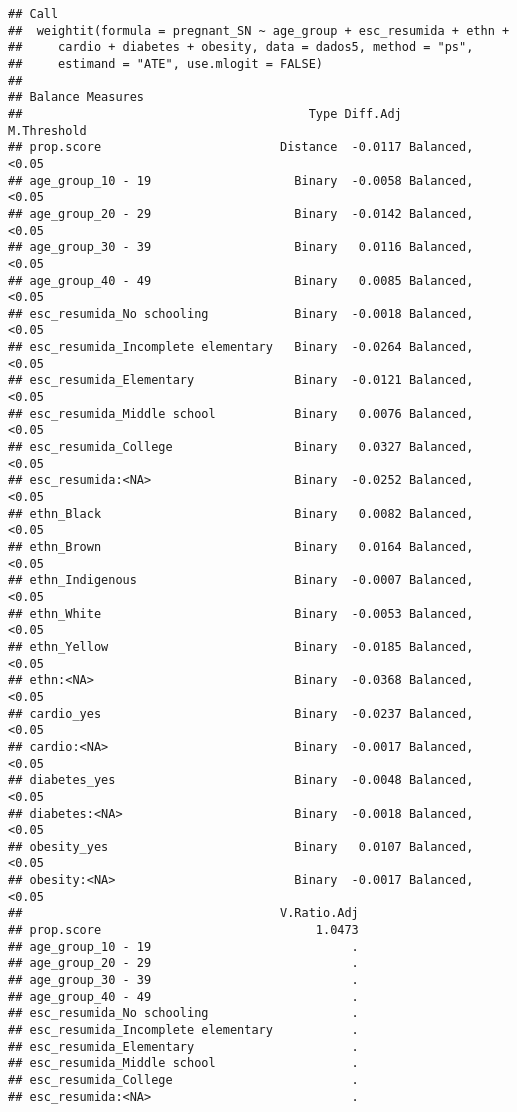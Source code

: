 \documentclass[
]{article}
\begin{document}
\begin{verbatim}
## Call
##  weightit(formula = pregnant_SN ~ age_group + esc_resumida + ethn + 
##     cardio + diabetes + obesity, data = dados5, method = "ps", 
##     estimand = "ATE", use.mlogit = FALSE)
## 
## Balance Measures
##                                        Type Diff.Adj     M.Threshold
## prop.score                         Distance  -0.0117 Balanced, <0.05
## age_group_10 - 19                    Binary  -0.0058 Balanced, <0.05
## age_group_20 - 29                    Binary  -0.0142 Balanced, <0.05
## age_group_30 - 39                    Binary   0.0116 Balanced, <0.05
## age_group_40 - 49                    Binary   0.0085 Balanced, <0.05
## esc_resumida_No schooling            Binary  -0.0018 Balanced, <0.05
## esc_resumida_Incomplete elementary   Binary  -0.0264 Balanced, <0.05
## esc_resumida_Elementary              Binary  -0.0121 Balanced, <0.05
## esc_resumida_Middle school           Binary   0.0076 Balanced, <0.05
## esc_resumida_College                 Binary   0.0327 Balanced, <0.05
## esc_resumida:<NA>                    Binary  -0.0252 Balanced, <0.05
## ethn_Black                           Binary   0.0082 Balanced, <0.05
## ethn_Brown                           Binary   0.0164 Balanced, <0.05
## ethn_Indigenous                      Binary  -0.0007 Balanced, <0.05
## ethn_White                           Binary  -0.0053 Balanced, <0.05
## ethn_Yellow                          Binary  -0.0185 Balanced, <0.05
## ethn:<NA>                            Binary  -0.0368 Balanced, <0.05
## cardio_yes                           Binary  -0.0237 Balanced, <0.05
## cardio:<NA>                          Binary  -0.0017 Balanced, <0.05
## diabetes_yes                         Binary  -0.0048 Balanced, <0.05
## diabetes:<NA>                        Binary  -0.0018 Balanced, <0.05
## obesity_yes                          Binary   0.0107 Balanced, <0.05
## obesity:<NA>                         Binary  -0.0017 Balanced, <0.05
##                                    V.Ratio.Adj
## prop.score                              1.0473
## age_group_10 - 19                            .
## age_group_20 - 29                            .
## age_group_30 - 39                            .
## age_group_40 - 49                            .
## esc_resumida_No schooling                    .
## esc_resumida_Incomplete elementary           .
## esc_resumida_Elementary                      .
## esc_resumida_Middle school                   .
## esc_resumida_College                         .
## esc_resumida:<NA>                            .

\end{verbatim}
\end{document}

